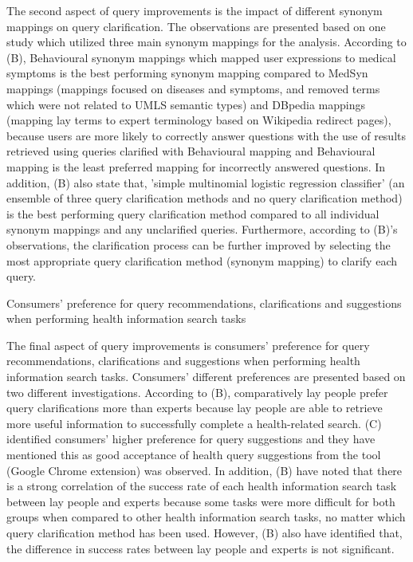 \documentclass[]{article}
\begin{document}
The second aspect of query improvements is the impact of different synonym mappings on query clarification. The observations are presented based on one study which utilized three main synonym mappings for the analysis. According to (B), Behavioural synonym mappings which mapped user expressions to medical symptoms is the best performing synonym mapping compared to MedSyn mappings (mappings focused on diseases and symptoms, and removed terms which were not related to UMLS semantic types) and DBpedia  mappings (mapping lay terms to expert terminology based on Wikipedia redirect pages), because users are more likely to correctly answer questions with the use of results retrieved using queries clarified with Behavioural mapping and Behavioural mapping is the least preferred mapping for incorrectly answered questions. In addition, (B) also state that, 'simple multinomial logistic regression classifier' (an ensemble of three query clarification methods and no query clarification method) is the best performing query clarification method compared to all individual synonym mappings and any unclarified queries. Furthermore, according to (B)'s observations, the clarification process can be further improved by selecting the most appropriate query clarification method (synonym mapping) to clarify each query.



Consumers' preference for query recommendations, clarifications and suggestions when performing health information search tasks 

The final aspect of query improvements is consumers' preference for query recommendations, clarifications and suggestions when performing health information search tasks. Consumers' different preferences are presented based on two different investigations. According to (B), comparatively lay people prefer query clarifications more than experts because lay people are able to retrieve  more useful information to successfully complete a health-related search. (C) identified consumers' higher preference for query suggestions and they have mentioned this as good acceptance of health query suggestions from the tool (Google Chrome extension) was observed. In addition, (B) have noted that there is a strong correlation of the success rate of each health information search task between lay people and experts because some tasks were more difficult for both groups when compared to other health information search tasks, no matter which query clarification method has been used. However, (B) also have identified that, the difference in success rates between lay people and experts is not significant. 
\end{document}
